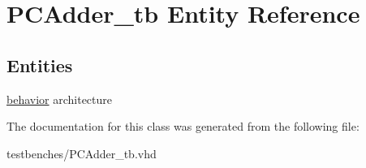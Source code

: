 \hypertarget{class_p_c_adder__tb}{\section{\-P\-C\-Adder\-\_\-tb \-Entity \-Reference}
\label{class_p_c_adder__tb}
}
\subsection*{\-Entities}
\begin{DoxyCompactItemize}
\item 
\hyperlink{class_p_c_adder__tb_1_1behavior}{behavior} architecture
\end{DoxyCompactItemize}


\-The documentation for this class was generated from the following file\-:\begin{DoxyCompactItemize}
\item 
testbenches/\-P\-C\-Adder\-\_\-tb.\-vhd\end{DoxyCompactItemize}
